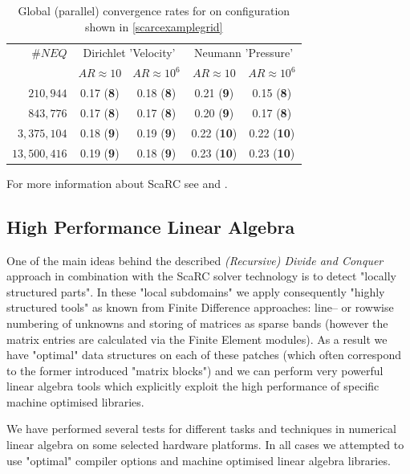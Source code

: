\begin{table}[!h]
\begin{center}
\begin{tabular}{|r||c|c|c|c|}
\hline
$\#NEQ$ \phantom{  }        & \multicolumn{2}{c|}{Dirichlet 'Velocity'} & \multicolumn{2}{c|}{Neumann 'Pressure'} \\
\cline{2-5}
& $AR \approx 10$ &  $AR \approx 10^{6}$ & $AR \approx 10$ &  $AR \approx 10^{6}$ \\
\hline \hline
   $210,944$    & 0.17 ({\bf 8}) & 0.18 ({\bf 8}) & 0.21 ({\bf 9}) & 0.15 ({\bf 8}) \\
   $843,776$    & 0.17 ({\bf 8}) & 0.17 ({\bf 8}) & 0.20 ({\bf 9})  & 0.17 ({\bf 8}) \\
   $3,375,104$  & 0.18 ({\bf 9}) & 0.19 ({\bf 9}) & 0.22 ({\bf 10}) & 0.22 ({\bf 10}) \\ 
   $13,500,416$ & 0.19 ({\bf 9}) & 0.18 ({\bf 9}) & 0.23 ({\bf 10}) & 0.23 ({\bf 10}) \\ 
   \hline
\end{tabular}
\end{center}
\caption{Global (parallel) convergence rates for \scarc on configuration shown in \ref{scarcexamplegrid}}
\label{scarcresults}
\end{table}


For
more information about {\sc ScaRC} see \cite{KilianTurek1998} and \cite{Kilian2001}.


\subsection{High Performance Linear Algebra}


One of the main ideas behind the described {\it (Recursive) Divide and Conquer} approach in 
combination with the {\sc ScaRC} solver technology is to detect "locally structured parts". 
In these "local subdomains" we apply consequently "highly structured tools" as known from Finite Difference  
approaches: line-- or rowwise numbering of unknowns and storing of matrices as 
sparse bands (however the matrix entries are calculated via the Finite Element modules). 
As a result we have "optimal" data structures on each of these patches (which often correspond to 
the former introduced "matrix blocks") and we can perform very powerful 
linear algebra tools which explicitly exploit the high performance of specific 
machine optimised libraries.

We have performed several tests for different tasks 
and techniques in numerical linear algebra  on some selected hardware platforms.
In all cases we attempted to use "optimal" compiler options and 
machine optimised linear algebra libraries.


